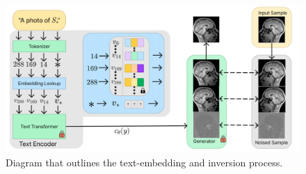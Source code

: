 \begin{figure}[H] 
\centering
\includegraphics[width=\columnwidth]{main/content/images/diagrams/ti_diagram.png}
\caption{Diagram that outlines the text-embedding and inversion process.}
\label{fig:textual_inversion_diagram}
\end{figure}